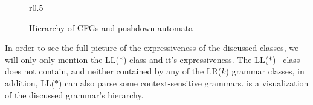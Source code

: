 \begin{wrapfigure}r{0.5\linewidth}
  \caption{ \label{Figure:expressiveness}
  Hierarchy of CFGs and pushdown automata}
  
\end{wrapfigure}
In order to see the full picture of the expressiveness of the discussed classes, we will only
  only mention the LL($*$) class and it's expressiveness. The LL($*$)~\cite{Parr:2011} class does not contain,
  and neither contained by any of the LR($k$) grammar classes, in addition, LL($*$) can also
  parse some context-sensitive grammars.
 is a visualization of the discussed grammar's hierarchy.


